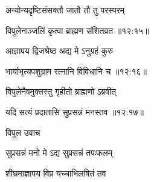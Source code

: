 {\devanagarifont अन्योन्यदृष्टिसंसक्तौ जातौ तौ तु परस्परम् \thinspace{\dandab} \dontdisplaylinenum }%


{\devanagarifont विपुलेनाञ्जलिं कृत्वा ब्राह्मण संशितव्रत {॥१२:१५॥} \veg\dontdisplaylinenum }%

{\devanagarifont आज्ञापय द्विजश्रेष्ठ अद्य मे ऽनुग्रहं कुरु \thinspace{\dandab} \dontdisplaylinenum }%


{\devanagarifont भार्याभृत्यपशुग्राम रत्नानि विविधानि च {॥१२:१६॥} \veg\dontdisplaylinenum }%

{\devanagarifont विपुलेनैवमुक्तस्तु गृहीतो ब्राह्मणो ऽब्रवीत् \thinspace{\dandab} \dontdisplaylinenum }%


{\devanagarifont यदि सत्यं प्रदातासि सुप्रसन्नं मनस्तव {॥१२:१७॥} \veg\dontdisplaylinenum }%

{\devanagarifont विपुल उवाच {\dandab}\dontdisplaylinenum  }%
 
{\devanagarifont सुप्रसन्नं मनो मे ऽद्य सुप्रसन्नं तपःफलम् \thinspace{\danda} \dontdisplaylinenum }%

{\devanagarifont शीघ्रमाज्ञापय विप्र यच्चाभिलषितं तव  \danda\dontdisplaylinenum }%

